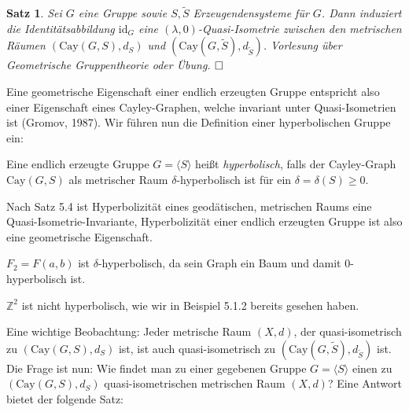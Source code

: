 \documentclass[11pt]{book}
\numberwithin{dummy}{section}
\newtheorem{theorem}{Satz}[section]
\theoremstyle{nonumberbreak}
\newenvironment{defin}[1][]{\ifthenelse{\equal{#1}{}}{\definition}{\definition[#1]}\rm}{\enddefinition}
\newenvironment{pr}[1][]{\ifthenelse{\equal{#1}{}}{\proof}{\proof[#1]}\rm}{\endproof}
\newenvironment{ex}[1][]{\ifthenelse{\equal{#1}{}}{\example}{\example[#1]}\rm}{\endexample}
\newcommand{\Z}{\mathbb{Z}}
\begin{document}
\begin{spacing}{1.4}
\begin{theorem}
Sei $G$ eine Gruppe sowie $S, \tilde{S}$ Erzeugendensysteme für $G$. Dann induziert die Identitätsabbildung $\mathrm{id}_G$ eine $(\lambda,0)$-Quasi-Isometrie zwischen den metrischen Räumen $(\mathrm{Cay}(G,S), d_S)$ und $(\mathrm{Cay}(G,\tilde{S}), d_{\tilde{S}})$.
\begin{pr}
Vorlesung über Geometrische Gruppentheorie oder Übung. $\hfill \Box$
\end{pr}
\end{theorem}

Eine geometrische Eigenschaft einer endlich erzeugten Gruppe entspricht also einer Eigenschaft eines Cayley-Graphen, welche invariant unter Quasi-Isometrien ist (Gromov, 1987).
Wir führen nun die Definition einer hyperbolischen Gruppe ein:

\begin{defin}
Eine endlich erzeugte Gruppe $G= \langle S\rangle$ heißt \textit{hyperbolisch}, falls der Cayley-Graph $\mathrm{Cay}(G,S)$ als metrischer Raum $\delta$-hyperbolisch ist für ein $\delta = \delta(S) \geqslant 0$.
\end{defin}

Nach Satz 5.4 ist Hyperbolizität eines geodätischen, metrischen Raums eine Quasi-Isometrie-Invariante, Hyperbolizität einer endlich erzeugten Gruppe ist also eine geometrische Eigenschaft.

\begin{ex} 
\begin{compactenum}
\item $F_2=F(a,b)$ ist $\delta$-hyperbolisch, da sein Graph ein Baum und damit $0$-hyperbolisch ist.
\item $\Z^2$ ist nicht hyperbolisch, wie wir in Beispiel 5.1.2 bereits gesehen haben.
\end{compactenum}
\end{ex}

Eine wichtige Beobachtung: Jeder metrische Raum $(X,d)$, der quasi-isometrisch zu $(\mathrm{Cay}(G,S), d_S)$ ist, ist auch quasi-isometrisch zu $(\mathrm{Cay}(G,\tilde{S}), d_{\tilde{S}})$ ist. Die Frage ist nun: Wie findet man zu einer gegebenen Gruppe $G=\langle S\rangle$ einen zu $(\mathrm{Cay}(G,S), d_S)$ quasi-isometrischen metrischen Raum $(X,d)$? Eine Antwort bietet der folgende Satz:


\end{spacing}
\end{document}
